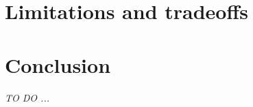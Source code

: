 \documentclass[10pt, twocolumn]{article}
\begin{document}
\section{Limitations and tradeoffs}


\section{Conclusion}
\textit{TO DO ...}


% 
 

\end{document}
